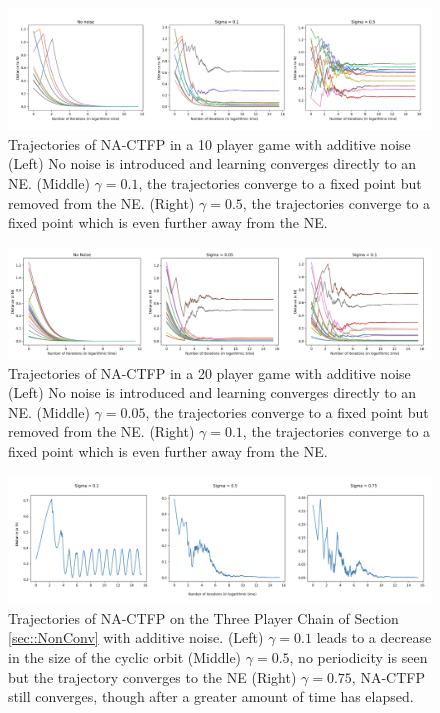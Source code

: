 \documentclass{article}
\theoremstyle{definition}
\begin{document}
  \begin{figure}[t]
    \centering
    \includegraphics[width = \columnwidth]{Figures/Noise10Player.png}
    \caption{\label{fig::Noise10Player} Trajectories of NA-CTFP in a 10 player game with additive noise (Left) No noise is introduced and learning converges directly to an NE. (Middle) $\gamma = 0.1$, the trajectories converge to a fixed point but removed from the NE. (Right) $\gamma = 0.5$, the trajectories converge to a fixed point which is even further away from the NE.}
  \end{figure}

  \begin{figure}[t]
    \centering
    \includegraphics[width = \columnwidth]{Figures/Noise20Player.png}
    \caption{\label{fig::Noise20Player} Trajectories of NA-CTFP in a 20 player game with additive noise (Left) No noise is introduced and learning converges directly to an NE. (Middle) $\gamma = 0.05$, the trajectories converge to a fixed point but removed from the NE. (Right) $\gamma = 0.1$, the trajectories converge to a fixed point which is even further away from the NE.}
  \end{figure}

  \begin{figure}[t]
    \centering
    \includegraphics[width = \columnwidth]{Figures/3PlayerChainNoise.png}
    \caption{\label{fig::3PlayerChainNoise} Trajectories of NA-CTFP on the Three Player Chain of Section \ref{sec::NonConv} with additive noise. (Left) $\gamma = 0.1$ leads to a decrease in the size of the cyclic orbit (Middle) $\gamma = 0.5$, no periodicity is seen but the trajectory converges to the NE (Right) $\gamma = 0.75$, NA-CTFP still converges, though after a greater amount of time has elapsed.}
  \end{figure}
\end{document}
